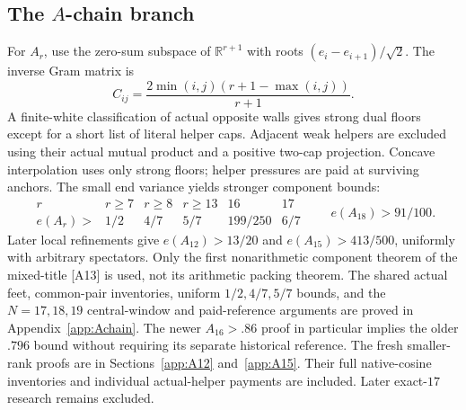 \documentclass[11pt]{article}
\theoremstyle{definition}
\theoremstyle{remark}
\newcommand{\R}{\mathbb R}
\newcommand{\src}[1]{\textnormal{\textsf{[#1]}}}
\begin{document}
\subsection{The \(A\)-chain branch}
For \(A_r\), use the zero-sum subspace of \(\R^{r+1}\) with roots
\((e_i-e_{i+1})/\sqrt2\). The inverse Gram matrix is
\[
 C_{ij}=\frac{2\min(i,j)(r+1-\max(i,j))}{r+1}.
\]
A finite-white classification of actual opposite walls gives
strong dual floors except for a short list of literal helper caps.
Adjacent weak helpers are excluded using their actual mutual
product and a positive two-cap projection. Concave interpolation
uses only strong floors; helper pressures are paid at surviving
anchors. The small end variance yields stronger component bounds:
\[
\begin{array}{c|ccccc}
r&r\geq7&r\geq8&r\geq13&16&17\\ \hline
e(A_r)>&1/2&4/7&5/7&199/250&6/7
\end{array}
\qquad e(A_{18})>91/100.
\]
Later local refinements give \(e(A_{12})>13/20\) and
\(e(A_{15})>413/500\), uniformly with arbitrary spectators.
Only the first nonarithmetic component theorem of the mixed-title
\src{A13} is used, not its arithmetic packing theorem.
The shared actual feet, common-pair inventories, uniform
\(1/2,4/7,5/7\) bounds, and the \(N=17,18,19\) central-window
and paid-reference arguments are proved in Appendix~\ref{app:Achain}.
The newer \(A_{16}>.86\) proof in particular implies the older
\(.796\) bound without requiring its separate historical reference.
The fresh smaller-rank proofs are in Sections~\ref{app:A12}
and~\ref{app:A15}. Their full native-cosine inventories and
individual actual-helper payments are included. Later exact-\(17\)
research remains excluded.
\end{document}
